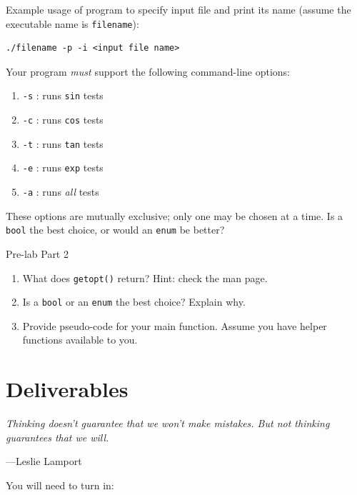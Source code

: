 \documentclass[11pt]{article}
\begin{document}
Example usage of program to specify input file and print its name (assume the
executable name is \texttt{filename}):
\begin{lstlisting}
./filename -p -i <input file name>
\end{lstlisting}

Your program \emph{must} support the following command-line options:
\begin{enumerate}
    \item \texttt{-s} : runs \texttt{sin} tests
    \item \texttt{-c} : runs \texttt{cos} tests
    \item \texttt{-t} : runs \texttt{tan} tests
    \item \texttt{-e} : runs \texttt{exp} tests
    \item \texttt{-a} : runs \emph{all} tests
\end{enumerate}

These options are mutually exclusive; only one may be chosen at a time. Is a
\texttt{bool} the best choice, or would an \texttt{enum} be better? \\

\begin{prelab}{Pre-lab Part 2}
  \begin{enumerate}
    \item What does \texttt{getopt()} return? Hint: check the man page.
    \item Is a \texttt{bool} or an \texttt{enum} the best choice? Explain why.
    \item Provide pseudo-code for your main function. Assume you have helper functions
          available to you.
  \end{enumerate}
\end{prelab}


\section{Deliverables}
\epigraph{\emph{Thinking doesn't guarantee that we won't make mistakes. But
not thinking guarantees that we will.}}{---Leslie Lamport}

\noindent You will need to turn in:
\end{document}
